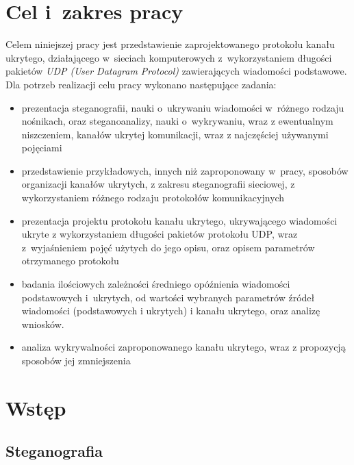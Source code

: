 \documentclass[a4paper, twoside, openright, 12pt]{report}
\begin{document}
\tableofcontents

\listoffigures

\chapter{Cel i~zakres pracy}
    Celem niniejszej pracy jest przedstawienie zaprojektowanego protokołu kanału
    ukrytego, działającego w~sieciach komputerowych z~wykorzystaniem długości pakietów
    \emph{UDP (User Datagram Protocol)} zawierających wiadomości podstawowe.
    Dla potrzeb realizacji celu pracy wykonano następujące zadania:
    \begin{itemize}
        \item prezentacja steganografii, nauki o~ukrywaniu wiadomości w~różnego rodzaju nośnikach,
            oraz steganoanalizy, nauki o~wykrywaniu, wraz z ewentualnym niszczeniem, kanałów
            ukrytej komunikacji, wraz z najczęściej używanymi pojęciami
        \item przedstawienie przykładowych, innych niż zaproponowany w~pracy,
            sposobów organizacji kanałów ukrytych, z zakresu steganografii sieciowej,
            z wykorzystaniem różnego rodzaju protokołów komunikacyjnych
        \item prezentacja projektu protokołu kanału ukrytego, ukrywającego
            wiadomości ukryte z wykorzystaniem długości pakietów protokołu UDP, wraz
            z~wyjaśnieniem pojęć użytych do jego opisu, oraz opisem parametrów otrzymanego protokołu
        \item badania ilościowych zależności średniego opóźnienia
            wiadomości podstawowych i~ukrytych, od wartości wybranych parametrów
            źródeł wiadomości (podstawowych i ukrytych) i kanału ukrytego, oraz analizę wniosków.
        \item analiza wykrywalności zaproponowanego kanału ukrytego,
            wraz z propozycją sposobów jej zmniejszenia
    \end{itemize}

\chapter{Wstęp}
    \section{Steganografia}
\end{document}
